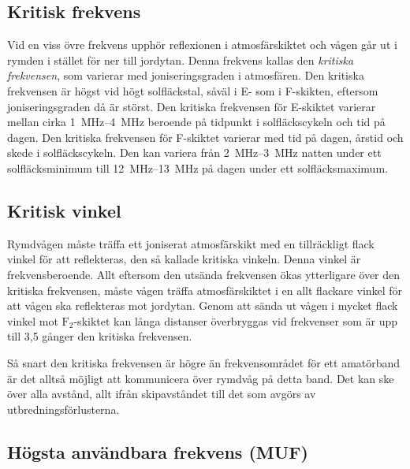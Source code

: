 \subsection{Kritisk frekvens}

Vid en viss övre frekvens upphör reflexionen i atmosfärskiktet och
vågen går ut i rymden i stället för ner till jordytan.
Denna frekvens kallas den \emph{kritiska frekvensen}, som varierar med
joniseringsgraden i atmosfären.
Den kritiska frekvensen är högst vid högt solfläckstal, såväl i E- som i
F-skikten, eftersom joniseringsgraden då är störst.
Den kritiska frekvensen för E-skiktet varierar mellan cirka
\SIrange{1}{4}{\mega\hertz} beroende på tidpunkt i solfläckscykeln och tid på
dagen.
Den kritiska frekvensen för F-skiktet varierar med tid på dagen, årstid och
skede i solfläckscykeln.
Den kan variera från \SIrange{2}{3}{\mega\hertz} natten under ett
solfläcksminimum till \SIrange{12}{13}{\mega\hertz} på dagen under ett
solfläcksmaximum.

\subsection{Kritisk vinkel}

Rymdvågen måste träffa ett joniserat atmosfärskikt med en tillräckligt
flack vinkel för att reflekteras, den så kallade kritiska vinkeln.
Denna vinkel är frekvensberoende.
Allt eftersom den utsända frekvensen ökas ytterligare över den kritiska
frekvensen, måste vågen träffa atmosfärskiktet i en allt flackare vinkel för att
vågen ska reflekteras mot jordytan.
Genom att sända ut vågen i mycket flack vinkel mot \(\mathrm{F_2}\)-skiktet kan
långa distanser överbryggas vid frekvenser som är upp till 3,5 gånger den
kritiska frekvensen.

Så snart den kritiska frekvensen är högre än frekvensområdet för ett
amatörband är det alltså möjligt att kommunicera över rymdvåg på detta band.
Det kan ske över alla avstånd, allt ifrån skipavståndet till det som avgörs av
utbredningsförlusterna.

\subsection{Högsta användbara frekvens (MUF)}


